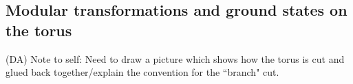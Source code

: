 \documentclass[12pt,a4paper]{article}
\newcommand{\tp}{\otimes}
\newcommand{\fld}{\mathcal{F}} %
\newcommand{\dave}[1]{{\color{ao(english)}\footnotesize{(DA) #1}}}
\newcommand{\Pantssvtsvtsh}{\mathord{\vcenter{\hbox{\texttt{[image: Pantssvtsvtsh.pdf]}}}}}
\newcommand{\Pantssvtsvsh}{\mathord{\vcenter{\hbox{\texttt{[image: Pantssvtsvsh.pdf]}}}}}
\newcommand{\Pantssvsvtsh}{\mathord{\vcenter{\hbox{\texttt{[image: Pantssvsvtsh.pdf]}}}}}
\newcommand{\Pantssvsvsh}{\mathord{\vcenter{\hbox{\texttt{[image: Pantssvsvsh.pdf]}}}}}
\newcommand{\PantssvtsvtX}{\mathord{\vcenter{\hbox{\texttt{[image: PantssvtsvtX.pdf]}}}}}
\newcommand{\PantssvtsvX}{\mathord{\vcenter{\hbox{\texttt{[image: PantssvtsvX.pdf]}}}}}
\newcommand{\PantssvsvtX}{\mathord{\vcenter{\hbox{\texttt{[image: PantssvsvtX.pdf]}}}}}
\newcommand{\PantssvsvX}{\mathord{\vcenter{\hbox{\texttt{[image: PantssvsvX.pdf]}}}}}
\newcommand{\PantssvtXsvt}{\mathord{\vcenter{\hbox{\texttt{[image: PantssvtXsvt.pdf]}}}}}
\newcommand{\PantssvXsvt}{\mathord{\vcenter{\hbox{\texttt{[image: PantssvXsvt.pdf]}}}}}
\newcommand{\PantssvtXsv}{\mathord{\vcenter{\hbox{\texttt{[image: PantssvtXsv.pdf]}}}}}
\begin{document}

\subsection{Modular transformations and ground states on the torus} \label{modulartforms}
\dave{Note to self: Need to draw a picture which shows how the torus is cut and glued back 
together/explain the convention for the ``branch" cut.}
\end{document}
